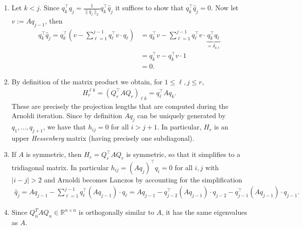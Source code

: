 {\color{solution}
\begin{enumerate}
	\item Let $k < j$. Since $q_k^\top q_j = \frac{1}{ \|\widehat{q}_j\|_2} q_k^\top \widehat{q}_j$ it suffices to show that $q_k^\top \widehat{q}_j=0$. Now let $v:=Aq_{j-1}$, then
	\begin{align*}
q_k^\top 	\widehat{q}_j  = q_k^\top \left(v - \sum_{\ell = 1}^{j-1} q_\ell^\top v  \cdot q_\ell\right)  
	&= q_k^\top v - \sum_{\ell = 1}^{j-1} q_\ell^\top v   \cdot \underbrace{q_k^\top q_\ell}_{= \delta_{k\ell}} \\
	&=q_k^\top v -  q_k^\top v\cdot 1\\
	&=0.  
	\end{align*}
	\item By definition of the matrix product we obtain, for $1\leq \ell,j \leq r$,
	\begin{align*}
	  H_r^{\ell k} = (Q_r^\top AQ_r)_{\ell k} = q_\ell ^\top Aq_k  .
	\end{align*}
	These are precisely the projection lengths that are computed during the Arnoldi iteration. Since by definition $Aq_j$ can be uniquely generated by $q_1,\ldots, q_{j+1}$, we have that $h_{ij} = 0$ for all $i> j+1$. In particular, $H_r$ is an upper \textit{Hessenberg} matrix (having precisely one subdiagonal).
	\item If $A$ is symmetric, then $H_r = Q_r^\top A Q_r$ is symmetric, so that it simplifies to a tridiagonal matrix. In particular $h_{ij} = (Aq_j)^\top q_i = 0$ for all $i,j$ with $|i-j|> 2$ and Arnoldi becomes Lanczos by accounting for the simplification
	\begin{align*}
	 \widehat{q}_j = Aq_{j-1} - \sum_{\ell = 1}^{j-1} q_\ell^\top(Aq_{j-1})  \cdot q_\ell
	 = Aq_{j-1} - q_{j-2}^\top(Aq_{j-1})  \cdot q_{j-2} - q_{j-1}^\top(Aq_{j-1})\cdot q_{j-1}.
	\end{align*}
  \item Since $Q_n^TAQ_n \in \mathbb{R}^{n \times n}$ is orthogonally similar to $A$, it has the same eigenvalues as $A$.
\end{enumerate}



}